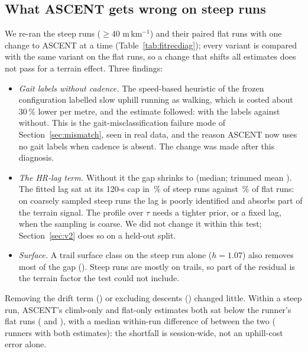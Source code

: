 \documentclass[11pt,a4paper]{article}
\newcommand{\ascent}{ASCENT}
\begin{document}
\subsection{What \ascent{} gets wrong on steep runs}\label{sec:fitrecgait}
We re-ran the steep runs ($\geq40$ m\,km$^{-1}$) and their paired flat runs with one change to \ascent{} at a time (Table~\ref{tab:fitrecdiag}); every variant is compared with the same variant on the flat runs, so a change that shifts all estimates does not pass for a terrain effect. Three findings:
\begin{itemize}[leftmargin=*]
\item \emph{Gait labels without cadence.} The speed-based heuristic of the frozen configuration labelled slow uphill running as walking, which is costed about 30\,\% lower per metre, and the estimate followed: \nfrDiagMedGaitH{} with the labels against \nfrDiagMedBase{} without. This is the gait-misclassification failure mode of Section~\ref{sec:mismatch}, seen in real data, and the reason \ascent{} now uses no gait labels when cadence is absent. The change was made after this diagnosis.
\item \emph{The HR-lag term.} Without it the gap shrinks to \nfrDiagMedNoLag{} (median; trimmed mean \nfrDiagTrimNoLag). The fitted lag sat at its 120-s cap in \nfrTauCapSteep\,\% of steep runs against \nfrTauCapFlat\,\% of flat runs: on coarsely sampled steep runs the lag is poorly identified and absorbs part of the terrain signal. The profile over $\tau$ needs a tighter prior, or a fixed lag, when the sampling is coarse. We did not change it within this test; Section~\ref{sec:v2} does so on a held-out split.
\item \emph{Surface.} A trail surface class on the steep run alone ($h=1.07$) also removes most of the gap (\nfrDiagMedTrailH). Steep runs are mostly on trails, so part of the residual is the terrain factor the test could not include.
\end{itemize}
Removing the drift term (\nfrDiagMedNoDrift) or excluding descents (\nfrDiagMedNoDesc) changed little. Within a steep run, \ascent's climb-only and flat-only estimates both sat below the runner's flat runs (\nfrDiagMedClimbs{} and \nfrDiagMedFlats), with a median within-run difference of \nfrDiagMedWithin{} between the two (\nfrDiagNWithin{} runners with both estimates): the shortfall is session-wide, not an uphill-cost error alone.
\end{document}
